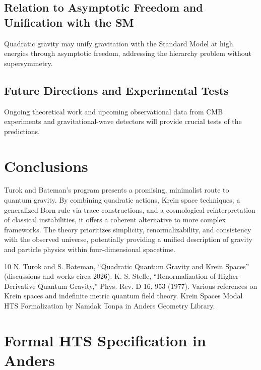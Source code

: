 \documentclass{article}
\begin{document}
\subsection{Relation to Asymptotic Freedom and Unification with the SM}

Quadratic gravity may unify gravitation with the Standard Model at high energies through asymptotic freedom, addressing the hierarchy problem without supersymmetry.

\subsection{Future Directions and Experimental Tests}

Ongoing theoretical work and upcoming observational data from CMB experiments and gravitational-wave detectors will provide crucial tests of the predictions.

\section{Conclusions}
\label{sec:conclusions}

Turok and Bateman's program presents a promising, minimalist route to quantum gravity. By combining quadratic actions, Krein space techniques, a generalized Born rule via trace constructions, and a cosmological reinterpretation of classical instabilities, it offers a coherent alternative to more complex frameworks. The theory prioritizes simplicity, renormalizability, and consistency with the observed universe, potentially providing a unified description of gravity and particle physics within four-dimensional spacetime.

\begin{thebibliography}{10}
 N. Turok and S. Bateman, ``Quadratic Quantum Gravity and Krein Spaces'' (discussions and works circa 2026).
 K. S. Stelle, ``Renormalization of Higher Derivative Quantum Gravity,'' Phys. Rev. D 16, 953 (1977).
 Various references on Krein spaces and indefinite metric quantum field theory.
 Krein Spaces Modal HTS Formalization by Namdak Tonpa in Anders Geometry Library.
\end{thebibliography}

\appendix
\section{Formal HTS Specification in Anders}
\label{sec:anders}
\end{document}
